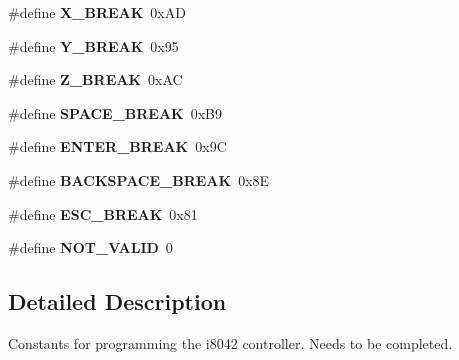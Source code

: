 \begin{DoxyCompactItemize}
\hypertarget{group__i8042_ga9c273d3928004114553508394fefdf90}{}\label{group__i8042_ga9c273d3928004114553508394fefdf90} 
\#define {\bfseries X\+\_\+\+B\+R\+E\+AK}~0x\+AD
\item 
\hypertarget{group__i8042_ga10829b1f7f377cbeaed355eb0e09c29b}{}\label{group__i8042_ga10829b1f7f377cbeaed355eb0e09c29b} 
\#define {\bfseries Y\+\_\+\+B\+R\+E\+AK}~0x95
\item 
\hypertarget{group__i8042_ga50ffeb6e62d9f40f723b19984e3ed81b}{}\label{group__i8042_ga50ffeb6e62d9f40f723b19984e3ed81b} 
\#define {\bfseries Z\+\_\+\+B\+R\+E\+AK}~0x\+AC
\item 
\hypertarget{group__i8042_ga95d6e4b61bac77469ecc47b205709af6}{}\label{group__i8042_ga95d6e4b61bac77469ecc47b205709af6} 
\#define {\bfseries S\+P\+A\+C\+E\+\_\+\+B\+R\+E\+AK}~0x\+B9
\item 
\hypertarget{group__i8042_ga768337bc3d53df1b45ef528bf747b645}{}\label{group__i8042_ga768337bc3d53df1b45ef528bf747b645} 
\#define {\bfseries E\+N\+T\+E\+R\+\_\+\+B\+R\+E\+AK}~0x9C
\item 
\hypertarget{group__i8042_gac809e10453e5d77552734079b12899ee}{}\label{group__i8042_gac809e10453e5d77552734079b12899ee} 
\#define {\bfseries B\+A\+C\+K\+S\+P\+A\+C\+E\+\_\+\+B\+R\+E\+AK}~0x8E
\item 
\hypertarget{group__i8042_ga343f44cb034d2d2ff3438b3d45dcde1f}{}\label{group__i8042_ga343f44cb034d2d2ff3438b3d45dcde1f} 
\#define {\bfseries E\+S\+C\+\_\+\+B\+R\+E\+AK}~0x81
\item 
\hypertarget{group__i8042_ga72695d31382ba5334881ad3407393642}{}\label{group__i8042_ga72695d31382ba5334881ad3407393642} 
\#define {\bfseries N\+O\+T\+\_\+\+V\+A\+L\+ID}~0
\end{DoxyCompactItemize}


\subsection{Detailed Description}
Constants for programming the i8042 controller. Needs to be completed. 

